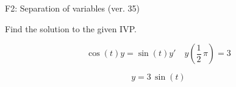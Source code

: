 \begin{exercise}
  \begin{exerciseTitle}F2: Separation of variables (ver. 35)\end{exerciseTitle}
  \begin{exerciseStatement}
    
Find the solution to the given IVP.

    
\[\cos\left(t\right) y= \sin\left(t\right) y'\hspace{1em} y\left( \frac{1}{2} \, \pi \right)= 3\]

  \end{exerciseStatement}
  \begin{exerciseAnswer}
    
\[y= 3 \, \sin\left(t\right)\]

  \end{exerciseAnswer}
\end{exercise}
